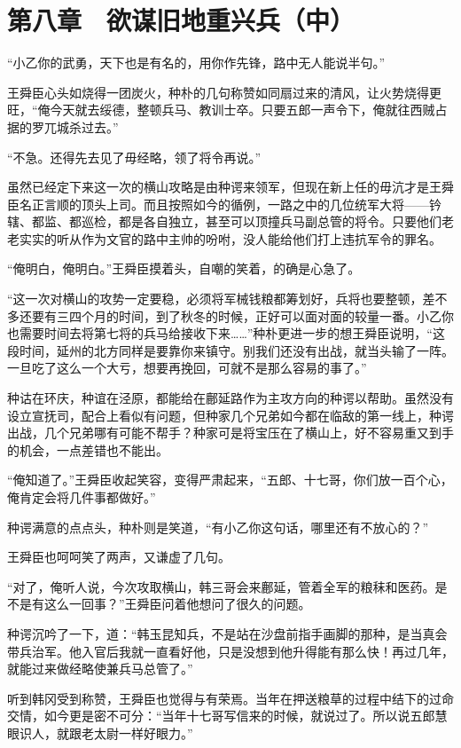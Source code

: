 \section{第八章　欲谋旧地重兴兵（中）}

“小乙你的武勇，天下也是有名的，用你作先锋，路中无人能说半句。”

王舜臣心头如烧得一团炭火，种朴的几句称赞如同扇过来的清风，让火势烧得更旺，“俺今天就去绥德，整顿兵马、教训士卒。只要五郎一声令下，俺就往西贼占据的罗兀城杀过去。”

“不急。还得先去见了毋经略，领了将令再说。”

虽然已经定下来这一次的横山攻略是由种谔来领军，但现在新上任的毋沆才是王舜臣名正言顺的顶头上司。而且按照如今的循例，一路之中的几位统军大将——钤辖、都监、都巡检，都是各自独立，甚至可以顶撞兵马副总管的将令。只要他们老老实实的听从作为文官的路中主帅的吩咐，没人能给他们打上违抗军令的罪名。

“俺明白，俺明白。”王舜臣摸着头，自嘲的笑着，的确是心急了。

“这一次对横山的攻势一定要稳，必须将军械钱粮都筹划好，兵将也要整顿，差不多还要有三四个月的时间，到了秋冬的时候，正好可以面对面的较量一番。小乙你也需要时间去将第七将的兵马给接收下来……”种朴更进一步的想王舜臣说明，“这段时间，延州的北方同样是要靠你来镇守。别我们还没有出战，就当头输了一阵。一旦吃了这么一个大亏，想要再挽回，可就不是那么容易的事了。”

种诂在环庆，种谊在泾原，都能给在鄜延路作为主攻方向的种谔以帮助。虽然没有设立宣抚司，配合上看似有问题，但种家几个兄弟如今都在临敌的第一线上，种谔出战，几个兄弟哪有可能不帮手？种家可是将宝压在了横山上，好不容易重又到手的机会，一点差错也不能出。

“俺知道了。”王舜臣收起笑容，变得严肃起来，“五郎、十七哥，你们放一百个心，俺肯定会将几件事都做好。”

种谔满意的点点头，种朴则是笑道，“有小乙你这句话，哪里还有不放心的？”

王舜臣也呵呵笑了两声，又谦虚了几句。

“对了，俺听人说，今次攻取横山，韩三哥会来鄜延，管着全军的粮秣和医药。是不是有这么一回事？”王舜臣问着他想问了很久的问题。

种谔沉吟了一下，道：“韩玉昆知兵，不是站在沙盘前指手画脚的那种，是当真会带兵治军。他入官后我就一直看好他，只是没想到他升得能有那么快！再过几年，就能过来做经略使兼兵马总管了。”

听到韩冈受到称赞，王舜臣也觉得与有荣焉。当年在押送粮草的过程中结下的过命交情，如今更是密不可分：“当年十七哥写信来的时候，就说过了。所以说五郎慧眼识人，就跟老太尉一样好眼力。”

